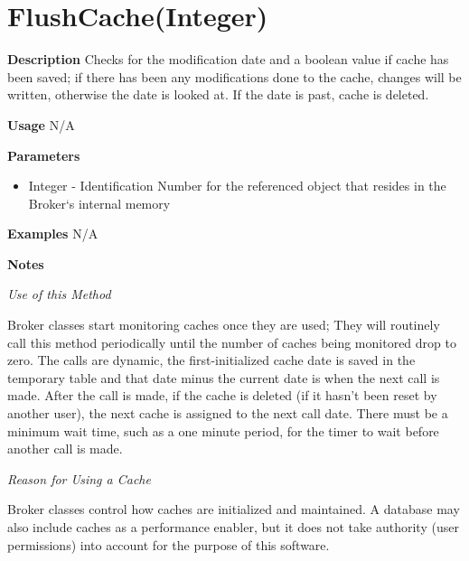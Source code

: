 \documentclass[letterpaper,12pt]{report}
\begin{document}
{
\pagebreak
\section{FlushCache(Integer)}
    \begin{description}
     \item \textbf{Description}
	\newline \hspace*{1cm} Checks for the modification date and a boolean value if cache has been saved; if there has been any modifications done to the cache, changes will be written, otherwise the date is looked at. If the date is past, cache is deleted.
     \item \textbf{Usage}
	\newline \hspace*{1cm} N/A
     \item \textbf{Parameters}
	\begin{itemize}
	   \item Integer - Identification Number for the referenced object that resides in the Broker`s internal memory
	  \end{itemize}
     \item \textbf{Examples}
	\newline \hspace*{1cm} N/A
     \item \textbf{Notes}
	\par \noindent 
	\textit{Use of this Method} 
	\par \noindent \hspace*{1cm} Broker classes start monitoring caches once they are used; They will routinely call this method periodically until the number of caches being monitored drop to zero. The calls are dynamic, the first-initialized cache date is saved in the temporary table and that date minus the current date is when the next call is made. After the call is made, if the cache is deleted (if it hasn't been reset by another user), the next cache is assigned to the next call date. There must be a minimum wait time, such as a one minute period, for the timer to wait before another call is made.
	\par \noindent
	\textit{Reason for Using a Cache} 
	\par \noindent \hspace*{1cm} Broker classes control how caches are initialized and maintained. A database may also include caches as a performance enabler, but it does not take authority (user permissions) into account for the purpose of this software. 

\end{description}}
\end{document}
